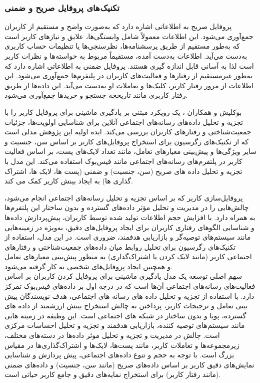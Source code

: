 \subsubsection{تکنیک های پروفایل صریح و ضمنی}
پروفایل صریح به اطلاعاتی اشاره دارد که به‌صورت واضح و مستقیم از کاربران جمع‌آوری می‌شود. این اطلاعات معمولاً شامل وابستگی‌ها، علایق و نیازهای کاربر است که به‌طور مستقیم از طریق پرسشنامه‌ها، نظرسنجی‌ها یا تنظیمات حساب کاربری به‌دست می‌آید. اطلاعات به‌‌دست آمده، مستقیماً مربوط به خواسته‌ها و نظرات کاربر است لذا به آسانی قابل اندازه گیری هستند.
\newline
پروفایل ضمنی به اطلاعاتی اشاره دارد که به‌طور غیرمستقیم از رفتارها و فعالیت‌های کاربران در پلتفرم‌ها جمع‌آوری می‌شود. این اطلاعات از مرور رفتار کاربر، کلیک‌ها و تعاملات او به‌دست می‌آید. این داده‌ها از طریق رفتار کاربری مانند تاریخچه جستجو و خریدها جمع‌آوری می‌شود. 
\newline

بوکلیش و همکاران %
\cite{azzam2022model}
 ،
 یک رویکرد مبتنی بر یادگیری ماشینی برای پروفایل کاربر را با تجزیه و تحلیل داده‌های رسانه‌های اجتماعی آنلاین برای شناسایی اولویت‌ها، جزئیات جمعیت‌شناختی و رفتارهای کاربران بررسی می‌کند. ایده اولیه این پژوهش مدلی است که از تکنیک‌های رگرسیون برای استخراج پروفایل‌های کاربر بر اساس سن، جنسیت و سایر ویژگی‌ها و پیش‌بینی معیارهای تعامل، مانند تعداد لایک‌های پست، بر اساس فعالیت کاربر در پلتفرم‌های رسانه‌های اجتماعی مانند فیس‌بوک استفاده می‌کند. این مدل با تجزیه و تحلیل داده های صریح (سن، جنسیت) و ضمنی (پست ها، لایک ها، اشتراک گذاری ها) به ایجاد بینش کاربر کمک می کند.

پروفایل‌سازی کاربر که بر اساس تجزیه و تحلیل رسانه‌های اجتماعی انجام می‌شود، چالش‌هایی را در مدیریت و تحلیل مؤثر داده‌های گسترده و بدون ساختار این پلتفرم‌ها به همراه دارد. با افزایش حجم اطلاعات تولید شده توسط کاربران، پیش‌پردازش داده‌ها و شناسایی الگوهای رفتاری کاربران برای ایجاد پروفایل‌های دقیق، به‌ویژه در زمینه‌هایی مانند سیستم‌های توصیه‌گر و بازاریابی هدفمند، ضروری است. در این مدل، استفاده از تکنیک‌های رگرسیون برای تحلیل روابط میان داده‌های جمعیت‌شناختی و رفتارهای اجتماعی کاربر (مانند لایک کردن یا اشتراک‌گذاری) به منظور پیش‌بینی معیارهای تعامل و همچنین ایجاد پروفایل‌های شخصی به کار گرفته می‌شود.\\


سهم اصلی 
\cite{azzam2022model}
 توسعه یک مدل یادگیری ماشینی برای پروفایل کردن کاربران بر اساس فعالیت‌های رسانه‌های اجتماعی آن‌ها است که در درجه اول بر داده‌های فیس‌بوک تمرکز دارد. با استفاده از تجزیه و تحلیل داده های رسانه های اجتماعی، هدف نویسندگان پیش بینی تعامل و ترجیحات کاربر، پرداختن به چالش استخراج بینش ارزشمند از داده های گسترده، پویا و بدون ساختار در شبکه های اجتماعی است. این وظیفه در زمینه هایی مانند سیستم های توصیه کننده، بازاریابی هدفمند و تجزیه و تحلیل احساسات مرکزی است.
چالش در مدیریت و تجزیه و تحلیل موثر داده‌ها در دسته‌های مختلف، زیرمجموعه‌ها و تعاملات کاربر، مانند پست‌ها، لایک‌ها و اشتراک‌گذاری‌ها در مقیاس بزرگ است. با توجه به حجم و تنوع داده‌های اجتماعی، پیش پردازش و شناسایی نمایش‌های دقیق کاربر بر اساس داده‌های صریح (مانند سن، جنسیت) و داده‌های ضمنی (مانند رفتار کاربر) برای استخراج نمایه‌های دقیق و جامع کاربر حیاتی است.

